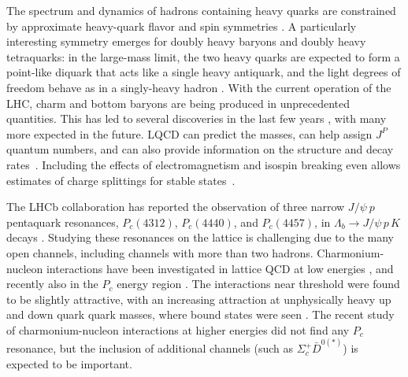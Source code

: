 The spectrum and dynamics of hadrons containing heavy quarks are constrained by approximate heavy-quark flavor and spin symmetries
\cite{Korner:1994nh, Manohar:2000dt}. A particularly interesting symmetry emerges for doubly heavy baryons and doubly heavy tetraquarks: in the large-mass limit, the two heavy quarks
are expected to form a point-like diquark that acts like a single heavy antiquark, and the light degrees of freedom behave as in a
singly-heavy hadron \cite{Carlson:1987hh, Savage:1990di, Manohar:1992nd, Brambilla:2005yk, Eichten:2017ffp}. With the current operation of the LHC, charm and bottom baryons are being produced in unprecedented quantities.
This has led to several discoveries in the last few years \cite{Chatrchyan:2012ni, Aaij:2012da, Aaij:2014yka, Aaij:2016jnn, Aaij:2017ueg,  Aaij:2017vbw, Aaij:2017nav, Aaij:2018yqz, Aaij:2018tnn}, with many more expected in the future. LQCD
can predict the masses, can help assign $J^P$ quantum numbers, and can also provide information on the structure and decay rates~\cite{Brown:2014ena, Padmanath:2015jea, Bali:2015lka, Can:2015exa, Alexandrou:2016xok, Bahtiyar:2018vub, Woloshyn:2016pid, Alexandrou:2017xwd, Mathur:2018epb, Mathur:2018rwu}. Including the effects of electromagnetism and isospin breaking even allows estimates of charge splittings for stable states~\cite{Borsanyi:2014jba}.

The LHCb collaboration has reported the observation of three narrow $J/\psi\: p$ pentaquark resonances, $P_c(4312)$, $P_c(4440)$, and $P_c(4457)$, in $\Lambda_b \to J/\psi\,p\,K$ decays \cite{Aaij:2015tga, Aaij:2019vzc}.
Studying these resonances on the lattice is challenging due to the many open channels, including channels with more than two hadrons. Charmonium-nucleon
interactions have been investigated in lattice QCD at low energies \cite{Yokokawa:2006td, Liu:2008rza, Kawanai:2010ev, Beane:2014sda}, and recently also in the $P_c$ energy region \cite{Skerbis:2018lew}. The interactions near threshold were found to be slightly attractive, with an increasing attraction at unphysically heavy up and down quark quark masses, where bound states were seen \cite{Beane:2014sda}. The recent study of charmonium-nucleon interactions at higher energies \cite{Skerbis:2018lew} did not find any $P_c$ resonance, but the inclusion of additional channels (such as $\Sigma_c^+ \bar{D}^{0(*)}$) is expected to be important.






